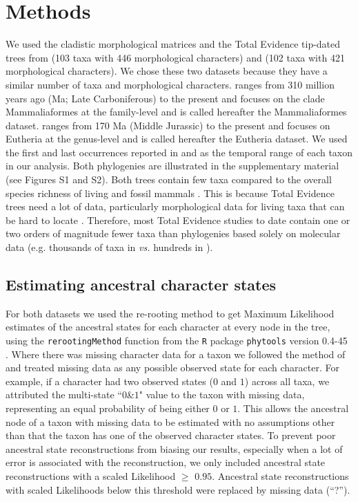 \documentclass[10pt,letterpaper]{article}
\begin{document}
\section*{Methods}
We used the cladistic morphological matrices and the Total Evidence tip-dated trees \cite{ronquista2012} from \cite{Slater2012MEE} (103 taxa with 446 morphological characters) and \cite{beckancient2014} (102 taxa with 421 morphological characters).
We chose these two datasets because they have a similar number of taxa and morphological characters.
\cite{Slater2012MEE} ranges from 310 million years ago (Ma; Late Carboniferous) to the present and focuses on the clade Mammaliaformes at the family-level and is called hereafter the Mammaliaformes dataset.
\cite{beckancient2014} ranges from 170 Ma (Middle Jurassic) to the present and focuses on Eutheria at the genus-level and is called hereafter the Eutheria dataset.
We used the first and last occurrences reported in \cite{Slater2012MEE} and \cite{beckancient2014} as the temporal range of each taxon in our analysis.
Both phylogenies are illustrated in the supplementary material (see Figures S1 and S2).
Both trees contain few taxa compared to the overall species richness of living and fossil mammals \cite{bininda2007delayed,archibald2011extinction}.
This is because Total Evidence trees need a lot of data, particularly morphological data for living taxa that can be hard to locate \cite{GuillermeCooper}.
Therefore, most Total Evidence studies to date contain one or two orders of magnitude fewer taxa than phylogenies based solely on molecular data (e.g. thousands of taxa in \cite{bininda2007delayed,meredithimpacts2011} \textit{vs.} hundreds in \cite{ronquista2012,Slater2012MEE,Wood01032013,beckancient2014}).

\subsection*{Estimating ancestral character states}
For both datasets we used the re-rooting method \cite{Yang01121995,Garland2000} to get Maximum Likelihood estimates of the ancestral states for each character at every node in the tree, using the \texttt{rerootingMethod} function from the \texttt{R} package \texttt{phytools} version 0.4-45 \cite{phytools,R}.
Where there was missing character data for a taxon we followed the method of \cite{Claddis} and treated missing data as any possible observed state for each character.
For example, if a character had two observed states ($0$ and $1$) across all taxa, we attributed the multi-state ``$0$\&$1$" value to the taxon with missing data, representing an equal probability of being either $0$ or $1$.
This allows the ancestral node of a taxon with missing data to be estimated with no assumptions other than that the taxon has one of the observed character states.
To prevent poor ancestral state reconstructions from biasing our results, especially when a lot of error is associated with the reconstruction, we only included ancestral state reconstructions with a scaled Likelihood $\geq$ $0.95$.
Ancestral state reconstructions with scaled Likelihoods below this threshold were replaced by missing data (``?'').
\end{document}
